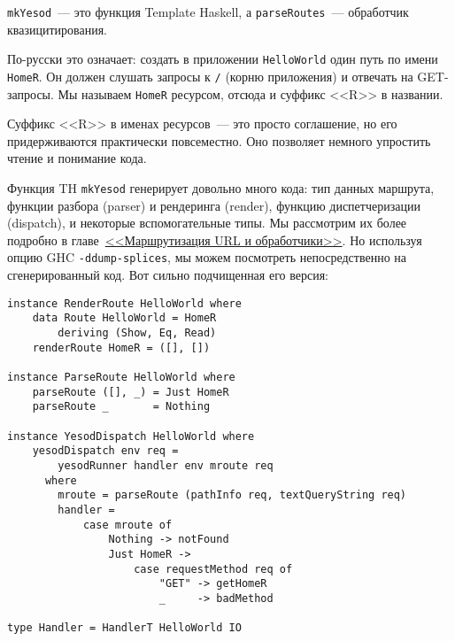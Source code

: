 \begin{remark}
  \lstinline!mkYesod!~--- это функция Template Haskell, а \lstinline!parseRoutes!~---
  обработчик квазицитирования.
\end{remark}

По-русски это означает: создать в приложении \texttt{HelloWorld} один путь по имени
\lstinline!HomeR!. Он должен слушать запросы к \texttt{/} (корню приложения) и отвечать на
GET-запросы. Мы называем \lstinline!HomeR! ресурсом, отсюда и суффикс <<R>> в названии.

\begin{remark}
  Суффикс <<R>> в именах ресурсов~--- это просто соглашение, но его придерживаются
  практически повсеместно. Оно позволяет немного упростить чтение и понимание кода.
\end{remark}

Функция TH \lstinline!mkYesod! генерирует довольно много кода: тип данных маршрута,
функции разбора (parser) и рендеринга (render), функцию диспетчеризации (dispatch),
и некоторые вспомогательные типы. Мы рассмотрим их более подробно в
главе~\hyperref[chap:routing]{<<Маршрутизация URL и обработчики>>}. Но используя опцию GHC
\lstinline'-ddump-splices', мы можем посмотреть непосредственно на сгенерированный
код. Вот сильно подчищенная его версия:

\begin{lstlisting}
instance RenderRoute HelloWorld where
    data Route HelloWorld = HomeR
        deriving (Show, Eq, Read)
    renderRoute HomeR = ([], [])

instance ParseRoute HelloWorld where
    parseRoute ([], _) = Just HomeR
    parseRoute _       = Nothing

instance YesodDispatch HelloWorld where
    yesodDispatch env req =
        yesodRunner handler env mroute req
      where
        mroute = parseRoute (pathInfo req, textQueryString req)
        handler =
            case mroute of
                Nothing -> notFound
                Just HomeR ->
                    case requestMethod req of
                        "GET" -> getHomeR
                        _     -> badMethod

type Handler = HandlerT HelloWorld IO
\end{lstlisting}

